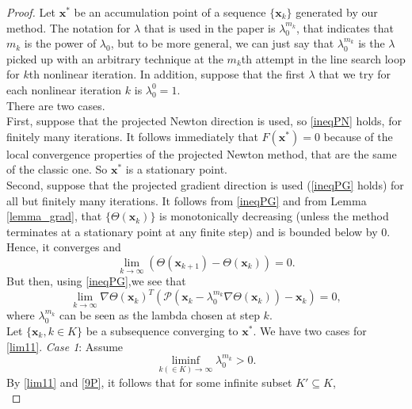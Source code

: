 \begin{proof}
	Let $ \textbf{x}^* $ be an accumulation point of a sequence $ \{\textbf{x}_k\} $ generated by our method. The notation for $ \lambda $ that is used in the paper \cite{MAIN} is $ \lambda_0^{m_k} $, that indicates that  $ m_k $ is the power of $ \lambda_0 $, but to be more general, we can just say that $ \lambda_0^{m_k} $ is the $ \lambda $ picked up with an arbitrary technique at the $ m_k $th attempt in the line search loop for $ k $th nonlinear iteration. In addition, suppose that the first $\lambda  $ that we try for each nonlinear iteration $ k $ is $ \lambda_0^0 = 1 $. \\
	There are two cases.\\
	First, suppose that the projected Newton direction is used, so \eqref{ineqPN} holds, for finitely many iterations. It follows immediately that $ F(\textbf{x}^*) = 0$ because of the local convergence properties of the projected Newton method, that are the same of the classic one. So $ \textbf{x}^* $ is a stationary point.\\
	Second, suppose that the projected gradient direction is used (\eqref{ineqPG} holds) for all but finitely many iterations.
	It follows from \eqref{ineqPG} and from Lemma \ref{lemma_grad}, that $ \{\Theta (\textbf{x}_k)\} $ is monotonically decreasing (unless the method terminates at a stationary point at any finite step) and is bounded below by 0. Hence, it converges and 
	\begin{equation*}
	\lim_{k \rightarrow \infty} ( \Theta (\textbf{x}_{k+1}) - \Theta (\textbf{x}_k) ) = 0.
	\end{equation*}
	But then, using \eqref{ineqPG},we see that 
	\begin{equation}
	\label{lim11}
	\lim_{k \rightarrow \infty} \nabla \Theta (\textbf{x}_k)^T (\mathcal{P} (\textbf{x}_k - \lambda_0^{m_k} \nabla \Theta (\textbf{x}_k))- \textbf{x}_k)=0, 
	\end{equation}
	where $ \lambda_0^{m_k} $ can be seen as the lambda chosen at step $ k $.\\
	Let $ \{ \textbf{x}_k, k \in K \} $ be a subsequence converging to $\textbf{x}^*$. We have two cases for \eqref{lim11}.
	\textit{Case 1}: Assume 
	\begin{equation*}
	\liminf_{k (\in K) \rightarrow \infty}  \lambda_0^{m_k} > 0.
	\end{equation*}
	By \eqref{lim11} and  \eqref{9P}, it follows that for some infinite subset $ K' \subseteq K $,
	\begin{equation*}

\end{equation*}
\end{proof}
